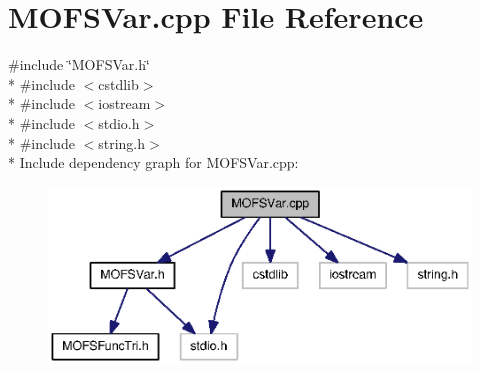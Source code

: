 \section{M\-O\-F\-S\-Var.\-cpp File Reference}
\label{MOFSVar_8cpp}
{\ttfamily \#include \char`\"{}M\-O\-F\-S\-Var.\-h\char`\"{}}\\*
{\ttfamily \#include $<$cstdlib$>$}\\*
{\ttfamily \#include $<$iostream$>$}\\*
{\ttfamily \#include $<$stdio.\-h$>$}\\*
{\ttfamily \#include $<$string.\-h$>$}\\*
Include dependency graph for M\-O\-F\-S\-Var.\-cpp\-:\nopagebreak
\begin{figure}[H]
\begin{center}
\leavevmode
\includegraphics[width=350pt]{MOFSVar_8cpp__incl}
\end{center}
\end{figure}
